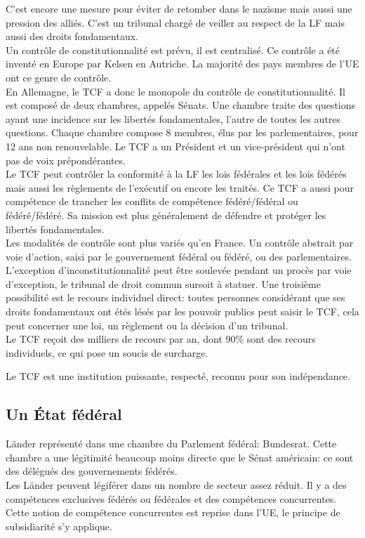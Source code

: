 \documentclass[10pt, a4paper, openany]{book}
\begin{document}
C'est encore une mesure pour éviter de retomber dans le nazisme mais aussi une pression des alliés. C'est un tribunal chargé de veiller au respect de la LF mais aussi des droits fondamentaux. \\
Un contrôle de constitutionnalité est prévu, il est centralisé. Ce contrôle a été inventé en Europe par Kelsen en Autriche. La majorité des pays membres de l'UE ont ce genre de contrôle. \\
En Allemagne, le TCF a donc le monopole du contrôle de constitutionnalité. Il est composé de deux chambres, appelés Sénats. Une chambre traite des questions ayant une incidence sur les libertés fondamentales, l'autre de toutes les autres questions. Chaque chambre compose 8 membres, élus par les parlementaires, pour 12 ans non renouvelable. Le TCF a un Président et un vice-président qui n'ont pas de voix prépondérantes. \\
Le TCF peut contrôler la conformité à la LF les lois fédérales et les lois fédérés mais aussi les règlements de l'exécutif ou encore les traités. Ce TCF a aussi pour compétence de trancher les conflits de compétence fédéré/fédéral ou fédéré/fédéré. Sa mission est plus généralement de défendre et protéger les libertés fondamentales. \\
Les modalités de contrôle sont plus variés qu'en France. Un contrôle abstrait par voie d'action, saisi par le gouvernement fédéral ou fédéré, ou des parlementaires. L'exception d'inconstitutionnalité peut être soulevée pendant un procès par voie d'exception, le tribunal de droit commun sursoit à statuer. Une troisième possibilité est le recours individuel direct: toutes personnes considérant que ses droits fondamentaux ont étés lésés par les pouvoir publics peut saisir le TCF, cela peut concerner une loi, un règlement ou la décision d'un tribunal. \\
Le TCF reçoit des milliers de recours par an, dont 90\% sont des recours individuels, ce qui pose un soucis de surcharge. 


Le TCF est une institution puissante, respecté, reconnu pour son indépendance. 

\subsection{Un État fédéral}

Länder représenté dans une chambre du Parlement fédéral: Bundesrat. Cette chambre a une légitimité beaucoup moins directe que le Sénat américain: ce sont des délégués des gouvernements fédérés. \\
Les Länder peuvent légiférer dans un nombre de secteur assez réduit. Il y a des compétences exclusives fédérés ou fédérales et des compétences concurrentes. Cette notion de compétence concurrentes est reprise dans l'UE, le principe de subsidiarité s'y applique. 
\end{document}
